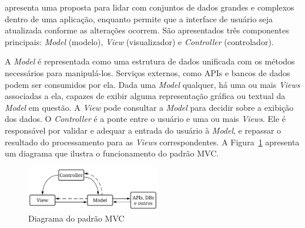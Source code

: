  apresenta uma proposta para lidar com conjuntos de dados grandes e complexos dentro de uma aplicação, enquanto permite que a interface de usuário seja atualizada conforme as alterações ocorrem.
São apresentados três componentes principais: \emph{Model} (modelo), \emph{View} (visualizador) e \emph{Controller} (controlador).

A \emph{Model} é representada como uma estrutura de dados unificada com os métodos necessários para manipulá-los.
Serviços externos, como APIs e bancos de dados podem ser consumidos por ela.
Dada uma \emph{Model} qualquer, há uma ou mais \emph{Views} associadas a ela, capazes de exibir alguma representação gráfica ou textual da \emph{Model} em questão.
A \emph{View} pode consultar a \emph{Model} para decidir sobre a exibição dos dados.
O \emph{Controller} é a ponte entre o usuário e uma ou mais \emph{Views}.
Ele é responsável por validar e adequar a entrada do usuário à \emph{Model}, e repassar o resultado do processamento para as \emph{Views} correspondentes.
A Figura~\ref{fig:mvc} apresenta um diagrama que ilustra o funcionamento do padrão MVC.

\begin{figure}[ht]
	\centering
	\includegraphics[width=0.52\textwidth]{images/mvc.png}
	\caption{Diagrama do padrão MVC}
	\label{fig:mvc}
\end{figure}